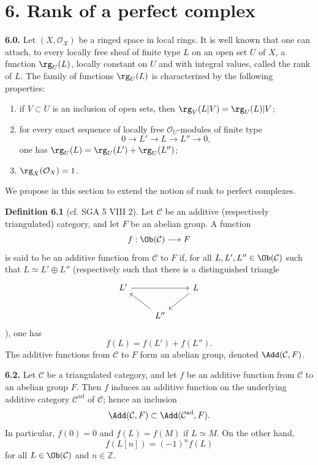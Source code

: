 \documentclass[11pt]{article}
\begin{document}
\section*{6. Rank of a perfect complex}

\textbf{6.0.} Let \((X,\mathcal O_X)\) be a ringed space in local rings. It is well known that one can attach, to every locally free sheaf of finite type \(L\) on an open set \(U\) of \(X\), a function \(\rg_U(L)\), locally constant on \(U\) and with integral values, called the rank of \(L\). The family of functions \(\rg_U(L)\) is characterized by the following properties:
\begin{enumerate}[label=(\roman*)]
\item if \(V\subset U\) is an inclusion of open sets, then \(\rg_V(L|V)=\rg_U(L)|V\);
\item for every exact sequence of locally free \(\mathcal O_U\)-modules of finite type
\[
  0\longrightarrow L'\longrightarrow L\longrightarrow L''\longrightarrow 0,
\]
one has \(\rg_U(L)=\rg_U(L')+\rg_U(L'')\);
\item \(\rg_X(\mathcal O_X)=1\).
\end{enumerate}
We propose in this section to extend the notion of rank to perfect complexes.

\textbf{Definition 6.1} (cf. SGA 5 VIII 2). Let \(\mathcal C\) be an additive (respectively triangulated) category, and let \(F\) be an abelian group. A function
\[
  f:\Ob(\mathcal C)\longrightarrow F
\]
is said to be an additive function from \(\mathcal C\) to \(F\) if, for all \(L,L',L''\in\Ob(\mathcal C)\) such that \(L\simeq L'\oplus L''\) (respectively such that there is a distinguished triangle
\[
\begin{tikzcd}
L' \arrow[rr] && L \arrow[dl]\\
& L'' \arrow[ul] &
\end{tikzcd}
\]
), one has
\[
  f(L)=f(L')+f(L'').
\]
The additive functions from \(\mathcal C\) to \(F\) form an abelian group, denoted \(\Add(\mathcal C,F)\).

\textbf{6.2.} Let \(\mathcal C\) be a triangulated category, and let \(f\) be an additive function from \(\mathcal C\) to an abelian group \(F\). Then \(f\) induces an additive function on the underlying additive category \(\mathcal C^{\mathrm{ad}}\) of \(\mathcal C\); hence an inclusion
\[
  \Add(\mathcal C,F)\subset \Add(\mathcal C^{\mathrm{ad}},F).
\]
In particular, \(f(0)=0\) and \(f(L)=f(M)\) if \(L\simeq M\). On the other hand,
\[
  f(L[n])=(-1)^n f(L)
\]
for all \(L\in\Ob(\mathcal C)\) and \(n\in\mathbb Z\).
\end{document}
